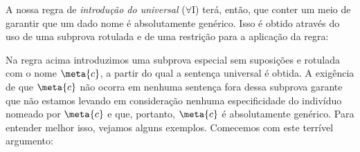 A nossa regra de \textit{introdução do universal} ($\forall$I) terá, então, que conter um meio de garantir que um dado nome é absolutamente genérico.
Isso é obtido através do uso de uma subprova rotulada e de uma restrição para a aplicação da regra:


 Na regra acima introduzimos uma subprova especial sem suposições e rotulada com o nome $\meta{c}$, a partir do qual a sentença universal é obtida.
 A exigência de que $\meta{c}$ não ocorra em nenhuma sentença fora dessa subprova garante que não estamos levando em consideração nenhuma especificidade do indivíduo nomeado por $\meta{c}$ e que, portanto, $\meta{c}$ é absolutamente genérico.
 Para entender melhor isso, vejamos alguns exemplos.
 Comecemos com este terrível argumento:  
 
